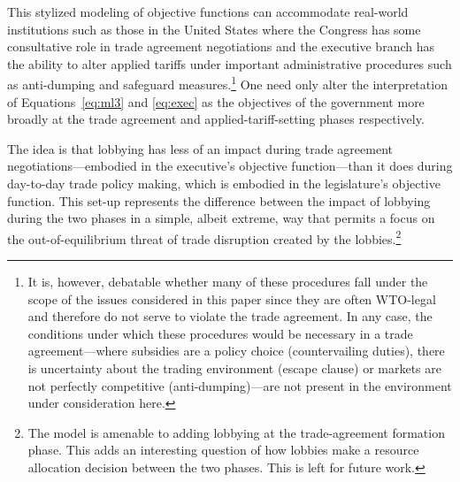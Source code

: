 \documentclass[authoryear, review]{elsarticle}
\begin{document}
This stylized modeling of objective functions can accommodate real-world institutions such as those in the United States where the Congress has some consultative role in trade agreement negotiations and the executive branch has the ability to alter applied tariffs under important administrative procedures such as anti-dumping and safeguard measures.\footnote{It is, however, debatable whether many of these procedures fall under the scope of the issues considered in this paper since they are often WTO-legal and therefore do not serve to violate the trade agreement. In any case, the conditions under which these procedures would be necessary in a trade agreement---where subsidies are a policy choice (countervailing duties), there is uncertainty about the trading environment (escape clause) or markets are not perfectly competitive (anti-dumping)---are not present in the environment under consideration here.} One need only alter the interpretation of Equations~\ref{eq:ml3} and \ref{eq:exec} as the objectives of the government more broadly at the trade agreement and applied-tariff-setting phases respectively.

The idea is that lobbying has less of an impact during trade agreement negotiations---embodied in the executive's objective function---than it does during day-to-day trade policy making, which is embodied in the legislature's objective function. This set-up represents the difference between the impact of lobbying during the two phases in a simple, albeit extreme, way that permits a focus on the out-of-equilibrium threat of trade disruption created by the lobbies.\footnote{The model is amenable to adding lobbying at the trade-agreement formation phase. This adds an interesting question of how lobbies make a resource allocation decision between the two phases. This is left for future work.} 
\end{document}
